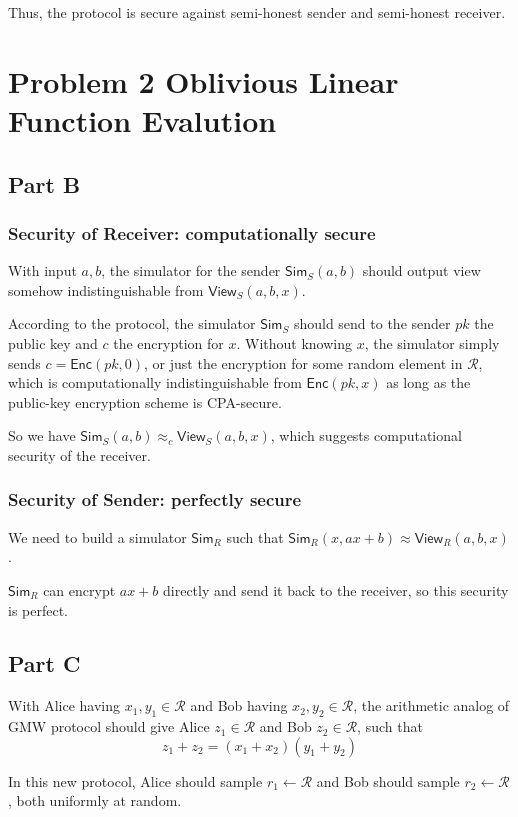 \documentclass[8pt]{article}
\theoremstyle{compact}
\def\Enc{\textsf{Enc}}
\begin{document}
Thus, the protocol is secure against semi-honest sender and semi-honest receiver.

\def\Sim{\textsf{Sim}}
\def\View{\textsf{View}}

\newpage
\section*{Problem 2 Oblivious Linear Function Evalution}
\subsection*{Part B}
\subsubsection*{Security of Receiver: computationally secure}
With input $a, b$, the simulator for the sender $\Sim_S(a, b)$ should output view somehow indistinguishable from $\View_S(a, b, x)$.

According to the protocol, the simulator $\Sim_S$ should send to the sender $pk$ the public key and $c$ the encryption for $x$. Without knowing $x$, the simulator simply sends $c = \Enc(pk, 0)$, or just the encryption for some random element in $\mathcal R$, which is computationally indistinguishable from $\Enc(pk, x)$ as long as the public-key encryption scheme is CPA-secure.

So we have $\Sim_S(a, b) \approx_c \View_S(a, b, x)$, which suggests computational security of the receiver.

\subsubsection*{Security of Sender: perfectly secure}
We need to build a simulator $\Sim_R$ such that $\Sim_R(x, ax + b) \approx \View_R(a, b, x)$.

$\Sim_R$ can encrypt $ax + b$ directly and send it back to the receiver, so this security is perfect.

\subsection*{Part C}
With Alice having $x_1, y_1 \in \mathcal R$ and Bob having $x_2, y_2 \in \mathcal R$, the arithmetic analog of GMW protocol should give Alice $z_1 \in \mathcal R$ and Bob $z_2 \in \mathcal R$, such that $$z_1 + z_2 = (x_1 + x_2)(y_1 + y_2)$$

In this new protocol, Alice should sample $r_1 \gets \mathcal R$ and Bob should sample $r_2 \gets \mathcal R$, both uniformly at random.
\end{document}
